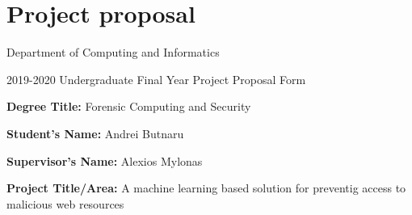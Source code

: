 \chapter{Project proposal}
\label{appendix:project_proposal}

\begin{center}
	\centerline{Department of Computing and Informatics}
	\centerline{2019-2020 Undergraduate Final Year Project Proposal Form}
\end{center}

\textbf{Degree Title:} Forensic Computing and Security

\textbf{Student's Name:} Andrei Butnaru

\textbf{Supervisor's Name:} Alexios Mylonas

\textbf{Project Title/Area:} A machine learning based solution for preventig access to malicious web resources

